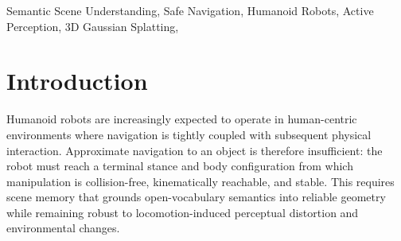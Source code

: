 \documentclass[conference]{IEEEtran}
\begin{document}
\begin{abstract}
%
Safe manipulation-oriented navigation for humanoid robots requires scene memory that remains reliable under locomotion-induced perceptual distortion, environmental changes, and interaction-level geometric safety constraints.
%
Existing semantic mapping and scene-graph systems are difficult to deploy directly in this setting because they often assume stable camera trajectories, static environments, or coarse object geometry.
%
We introduce the \textbf{Multi-modal Interactive Field (MIF)}, a humanoid-oriented system that integrates confidence-aware semantic 3D Gaussian Splatting, discrepancy-triggered spatial memory updates, and task-driven geometric reconstruction within a closed-loop perception-adaptation pipeline.
%
MIF couples three fields: an uncertainty-aware 3DGS Appearance Field that suppresses gait-induced blur, a Spatial Field that maintains topological memory, and a Geometry Field that supports \textbf{Interaction Pose Safety (IPS)} before manipulation.
%
The discrepancy score $\mathcal{D}$ separates locomotion-induced false-positive changes from persistent changes and updates only locally inconsistent regions.
%
On a \textbf{Unitree-G1 humanoid} in a real dynamic office, MIF improves relocation success in non-static environments from 12\% to \textbf{94\%} compared with static scene-graph memory, while reducing semantic memory footprint by 91.4\% through feature distillation for practical online operation.
\end{abstract}

\begin{keywords}
Semantic Scene Understanding, Safe Navigation, Humanoid Robots, Active Perception, 3D Gaussian Splatting, 
\end{keywords}

\IEEEpeerreviewmaketitle


\section{Introduction}
%
Humanoid robots are increasingly expected to operate in human-centric environments where navigation is tightly coupled with subsequent physical interaction.
%
Approximate navigation to an object is therefore insufficient: the robot must reach a terminal stance and body configuration from which manipulation is collision-free, kinematically reachable, and stable.
%
This requires scene memory that grounds open-vocabulary semantics into reliable geometry while remaining robust to locomotion-induced perceptual distortion and environmental changes.
%
\end{document}

